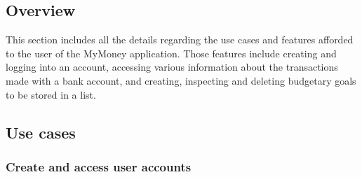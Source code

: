 \documentclass[letterpaper]{article}
\begin{document}
	\subsection{Overview}
	
		This section includes all the details regarding the use cases and features afforded to the user of the MyMoney application. Those features include creating and logging into an account, accessing various information about the transactions made with a bank account, and creating, inspecting and deleting budgetary goals to be stored in a list.
	
	\subsection{Use cases}
	
		\subsubsection{Create and access user accounts}
		
\end{document}
